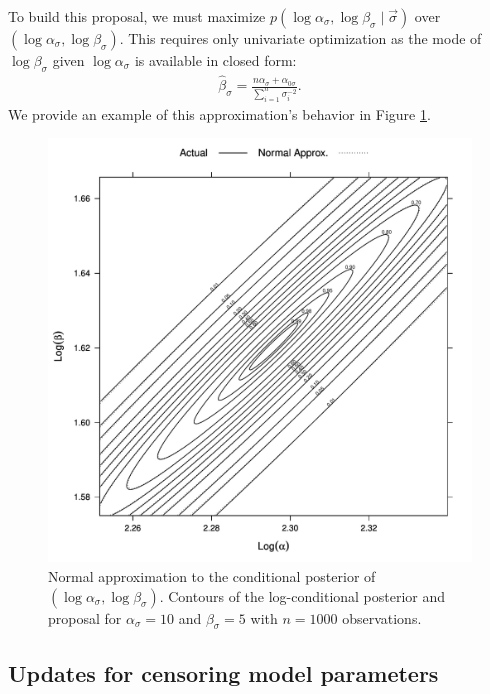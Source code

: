 To build this proposal, we must maximize $p(\log \alpha_{\sigma}, \log \beta_{\sigma} \mid \vec{\sigma})$ over $(\log \alpha_{\sigma}, \log \beta_{\sigma})$.
This requires only univariate optimization as the mode of $\log \beta_\sigma$ given $\log \alpha_\sigma$ is available in closed form:
\begin{eqnarray}
\hat{\beta}_{\sigma} = \frac{n\alpha_{\sigma} + \alpha_{0 \sigma}}{\sum_{i=1}^{n}\sigma_{i}^{-2}} .
\end{eqnarray}
We provide an example of this approximation's behavior in Figure \ref{fig:Normal-approximation-to-log-gamma-pars}.

\begin{figure}
\centering
\includegraphics[width=\textwidth]{figures/proteomics/gamma_normal_approx}

\caption{Normal approximation to the conditional posterior of $(\log \alpha_\sigma, \log \beta_\sigma)$. Contours of the log-conditional posterior and proposal for $\alpha_\sigma=10$ and $\beta_\sigma=5$ with $n=1000$ observations.\label{fig:Normal-approximation-to-log-gamma-pars}} 
\end{figure}




\subsection{Updates for censoring model parameters}


